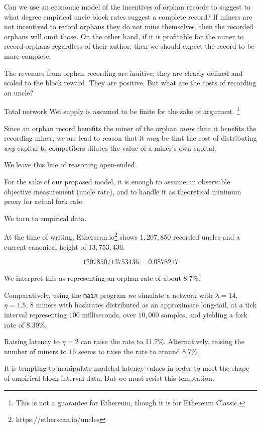 \documentclass[11pt]{article}
\theoremstyle{plain}
\begin{document}
Can we use an economic model of the incentives of orphan records to suggest to
what degree empirical uncle block rates suggest a complete record?
If miners are not incentived to record orphans they do not mine themselves,
then the recorded orphans will omit those. On the other hand, if it is
profitable for the miner to record orphans regardless of their author, then we
should expect the record to be more complete.

The revenues from orphan recording are inuitive; they are clearly defined and
scaled to the block reward. They are positive. But what are the costs of
recording an uncle?

Total network Wei supply is assumed to be finite for the sake of
argument.\nolinebreak
\footnote{This is not a guarantee for Ethereum, though it is for Ethereum Classic.}

Since an orphan record benefits the miner of the orphan \emph{more} than it
benefits the recording miner, we are lead to reason that it \emph{may} be that the
cost of distributing \emph{any} capital to competitors dilutes the value of a
miner's own capital.

We leave this line of reasoning open-ended.

For the sake of our proposed model, it is enough to assume an observable
objective measurement (uncle rate), and to handle it as theoretical minimum
proxy for actual fork rate.

We turn to empirical data.

At the time of writing, Etherscan.io\footnote{https://etherscan.io/uncles}
shows $1,207,850$ recorded uncles and a current canonical height of $13,753,436$. 

\begin{equation}
  1207850 / 13753436 = 0.0878217
\end{equation}

We interpret this as representing an orphan rate of about 8.7\%. 

Comparatively, using the \texttt{main} program we simulate a network with
$\lambda=14$, $\eta=1.5$, $8$ miners with hashrates distributed as an
approximate long-tail, at a tick interval representing $100$ milliseconds, over
$10,000$ samples, and yielding a fork rate of 8.39\%. 

Raising latency to $\eta=2$ can raise the rate to 11.7\%.
Alternatively, raising the number of miners to $16$ seems to raise the rate to
around 8.7\%.

It is tempting to manipulate modeled latency values in order to meet the
shape of empirical block interval data. But we must resist this temptation.
\end{document}
